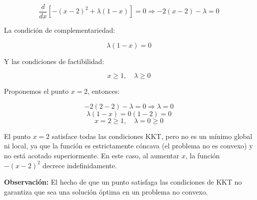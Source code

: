 \begin{enumerate}
\[
\frac{d}{dx} [-(x - 2)^2 + \lambda(1-x)] = 0 \Rightarrow -2(x - 2) - \lambda = 0
\]

La condición de complementariedad:

\[
\lambda(1 - x) = 0
\]

Y las condiciones de factibilidad:

\[
x \geq 1, \quad \lambda \geq 0
\]

Proponemos el punto \( x = 2 \), entonces:

\[
-2(2 - 2) - \lambda = 0 \Rightarrow \lambda = 0
\]
\[
\lambda(1 - x) = 0(1 - 2) = 0
\]
\[
x = 2 \geq 1, \quad \lambda = 0 \geq 0
\]

El punto \( x = 2 \) satisface todas las condiciones KKT, pero no es un mínimo global ni local, ya que la función es estrictamente cóncava (el problema no es convexo) y no está acotado superiormente. En este caso, al aumentar \( x \), la función \( -(x - 2)^2 \) decrece indefinidamente.

\textbf{Observación:} El hecho de que un punto satisfaga las condiciones de KKT no garantiza que sea una solución óptima en un problema no convexo.
\end{enumerate}
